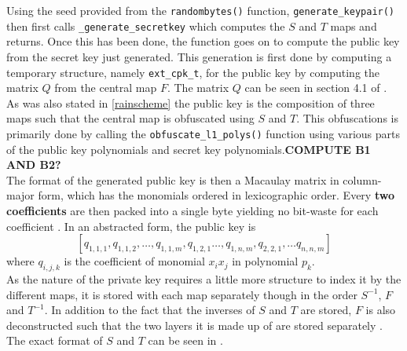 Using the seed provided from the \texttt{randombytes()} function, \texttt{generate\_keypair()} then first calls \texttt{\_generate\_secretkey} which computes the $S$ and $T$ maps and returns. Once this has been done, the function goes on to compute the public key from the secret key just generated. This generation is first done by computing a temporary structure, namely \texttt{ext\_cpk\_t}, for the public key by computing the matrix $Q$ from the central map $F$. The matrix $Q$ can be seen in section 4.1 of \cite{rainbownist}. As was also stated in \cref{rainscheme} the public key is the composition of three maps such that the central map is obfuscated using $S$ and $T$. This obfuscations is primarily done by calling the \texttt{obfuscate\_l1\_polys()} function using various parts of the public key polynomials and secret key polynomials.\textbf{COMPUTE B1 AND B2?}\medskip\\
The format of the generated public key is then a Macaulay matrix in column-major form, which has the monomials ordered in lexicographic order. Every \textbf{two coefficients} are then packed into a single byte yielding no bit-waste for each coefficient \cite{rainbownist}. In an abstracted form, the public key is
$$
    [q_{1,1,1}, q_{1,1,2}, \dots,q_{1,1,m},q_{1,2,1} \dots , q_{1,n,m}, q_{2,2,1}, \dots q_{n,n,m}]
$$
where $q_{i,j,k}$ is the coefficient of monomial $x_ix_j$ in polynomial $p_k$.\medskip\\
As the nature of the private key requires a little more structure to index it by the different maps, it is stored with each map separately though in the order $S^{-1}$, $F$ and $T^{-1}$. In addition to the fact that the inverses of $S$ and $T$ are stored, $F$ is also deconstructed such that the two layers it is made up of are stored separately \cite{rainbownist}. The exact format of $S$ and $T$ can be seen in \cite{rainbownist}.
